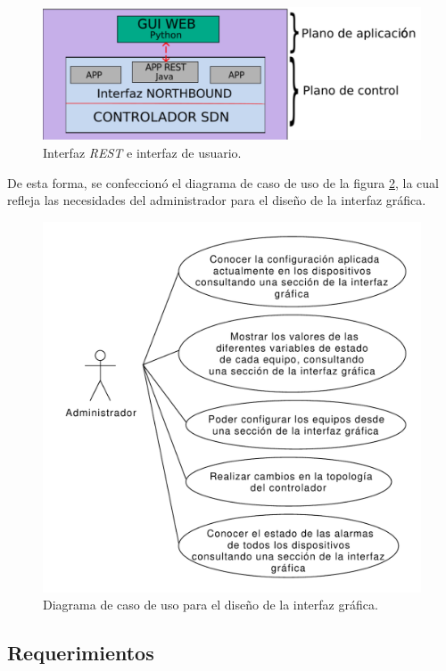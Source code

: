   \begin{figure}[H]
    \centering
    \includegraphics[scale=0.60]{Figures/arq-rest-gui.pdf}
    \caption{Interfaz \textit{REST} e interfaz de usuario.}
    \label{fig:ubicacionapp}
  \end{figure}

  De esta forma, se confeccionó el diagrama de caso de uso de la figura \ref{fig:diaguso_gui}, la cual refleja las necesidades del administrador para el diseño de la interfaz gráfica. 

  \begin{figure}[H]
    \centering
    \includegraphics[scale=0.55]{Figures/caso_uso_gui.pdf}
    \caption{Diagrama de caso de uso para el diseño de la interfaz gráfica.}
    \label{fig:diaguso_gui}
  \end{figure}

  \subsection{Requerimientos}

